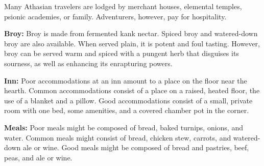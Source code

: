 Many Athasian travelers are lodged by merchant houses, elemental temples, psionic academies, or family. Adventurers, however, pay for hospitality.


\textbf{Broy:} Broy is made from fermented kank nectar. Spiced broy and watered-down broy are also available. When served plain, it is potent and foul tasting. However, broy can be served warm and spiced with a pungent herb that disguises its sourness, as well as enhancing its enrapturing powers.

\textbf{Inn:} Poor accommodations at an inn amount to a place on the floor near the hearth. Common accommodations consist of a place on a raised, heated floor, the use of a blanket and a pillow. Good accommodations consist of a small, private room with one bed, some amenities, and a covered chamber pot in the corner.

\textbf{Meals:} Poor meals might be composed of bread, baked turnips, onions, and water. Common meals might consist of bread, chicken stew, carrots, and watered-down ale or wine. Good meals might be composed of bread and pastries, beef, peas, and ale or wine.